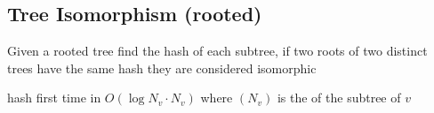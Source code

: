 \subsection{Tree Isomorphism (rooted)}

Given a rooted tree find the hash of each subtree, if two roots of two distinct trees have the same hash they are considered isomorphic

hash first time in $O(\log{N_v} \cdot N_v)$ where $(N_v)$ is the of the subtree of $v$

